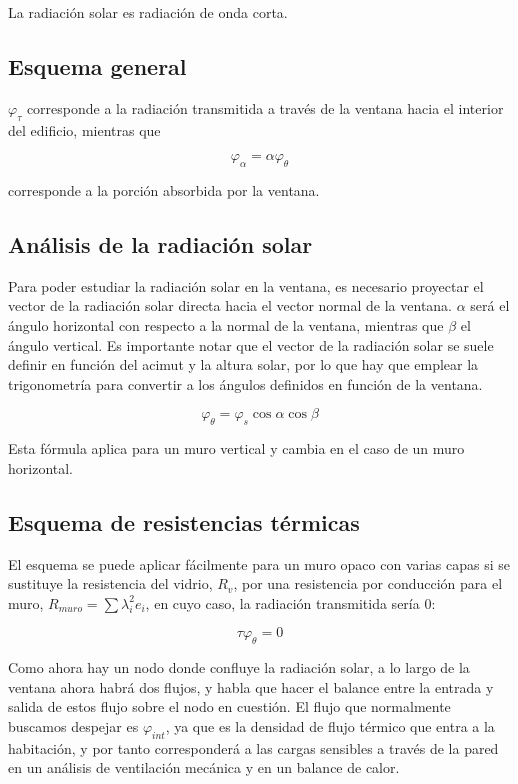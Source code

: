 \documentclass[11pt]{article}
\begin{document}
La radiación solar es radiación de onda corta.

\subsection{Esquema general}

$ \varphi _\tau $ corresponde a la radiación transmitida a través de la ventana hacia el interior del edificio, mientras que

\[ \varphi _\alpha = \alpha \varphi _\theta \]

corresponde a la porción absorbida por la ventana.

\subsection{Análisis de la radiación solar}

Para poder estudiar la radiación solar en la ventana, es necesario proyectar el vector de la radiación solar directa hacia el vector normal de la ventana. $ \alpha $ será el ángulo horizontal con respecto a la normal de la ventana, mientras que $ \beta $ el ángulo vertical. Es importante notar que el vector de la radiación solar se suele definir en función del acimut y la altura solar, por lo que hay que emplear la trigonometría para convertir a los ángulos definidos en función de la ventana.

\[ \varphi _\theta = \varphi _s \cos \alpha \cos \beta \]

Esta fórmula aplica para un muro vertical y cambia en el caso de un muro horizontal.

\subsection{Esquema de resistencias térmicas}

El esquema se puede aplicar fácilmente para un muro opaco con varias capas si se sustituye la resistencia del vidrio, $ R_v $, por una resistencia por conducción para el muro, $ R_{ muro } = \sum{ \lambda ^2 _{i} e_i } $, en cuyo caso, la radiación transmitida sería 0:

\[ \tau \varphi _\theta = 0 \]

Como ahora hay un nodo donde confluye la radiación solar, a lo largo de la ventana ahora habrá dos flujos, y habla que hacer el balance entre la entrada y salida de estos flujo sobre el nodo en cuestión. El flujo que normalmente buscamos despejar es $ \varphi _{ int } $, ya que es la densidad de flujo térmico que entra a la habitación, y por tanto corresponderá a las cargas sensibles a través de la pared en un análisis de ventilación mecánica y en un balance de calor.
\end{document}
